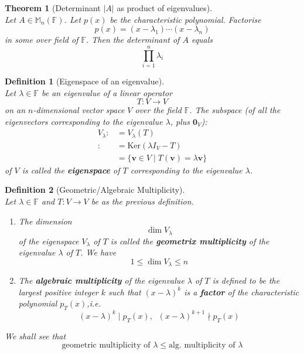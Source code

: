 \documentclass[12pt]{article}
\newcommand{\kerne}{\mathrm{Ker}}
\newtheorem{definition}{Definition}[section]
\newtheorem{theorem}{Theorem}[section]
\theoremstyle{definition}
\begin{document}
\begin{theorem}[Determinant $|A|$ as product of eigenvalues]
\hfill\\\normalfont Let $A\in\mathbb{M}_n(\mathbb{F})$. Let $p(x)$ be the characteristic polynomial. Factorise
\[
p(x)=(x-\lambda_1)\cdots(x-\lambda_n)
\]
in some over field of $\mathbb{F}$. Then the determinant of $A$ equals
\[
\prod_{i=1}^n\lambda_i
\]
\end{theorem}
\begin{definition}[Eigenspace of an eigenvalue]
\hfill\\\normalfont Let $\lambda\in\mathbb{F}$ be an eigenvalue of a linear operator
\[
T:V\to V
\]
on an $n$-dimensional vector space $V$ over the field $\mathbb{F}$.
The subspace (of all the eigenvectors corresponding to the eigenvalue $\lambda$, plus $\mathbf{0}_V$):
\[
\begin{aligned}
V_\lambda:&=V_\lambda(T)\\
:&=\kerne(\lambda I_V-T)\\
&=\{\mathbf{v}\in V\mid T(\mathbf{v})=\lambda\mathbf{v}\}
\end{aligned}
\]
of $V$ is called the \textbf{eigenspace} of $T$ corresponding to the eigenvalue $\lambda$.
\end{definition}
\begin{definition}[Geometric/Algebraic Multiplicity]
\hfill\\\normalfont Let $\lambda\in\mathbb{F}$ and $T:V\to V$ be as the previous definition.
\begin{enumerate}[label=(\arabic*)]
\item The dimension
\[
\dim V_\lambda
\]
of the eigenspace $V_\lambda$ of $T$ is called the \textbf{geometrix multiplicity} of the eigenvalue $\lambda$ of $T$. We have
\[
1\leq \dim V_\lambda\leq n
\]
\item The \textbf{algebraic multiplicity} of the eigenvalue $\lambda$ of $T$ is defined to be the largest positive integer $k$ such that $(x-\lambda)^k$ is a \textbf{factor} of the characteristic polynomial $p_T(x)$,i.e.
\[
(x-\lambda)^k\mid p_T(x),\;\;(x-\lambda)^{k+1}\nmid p_T(x)
\] 
\end{enumerate}
We shall see that
\[
\text{geometric multiplicity of }\lambda\leq \text{alg. multiplicity of }\lambda
\]
\end{definition}
\end{document}

